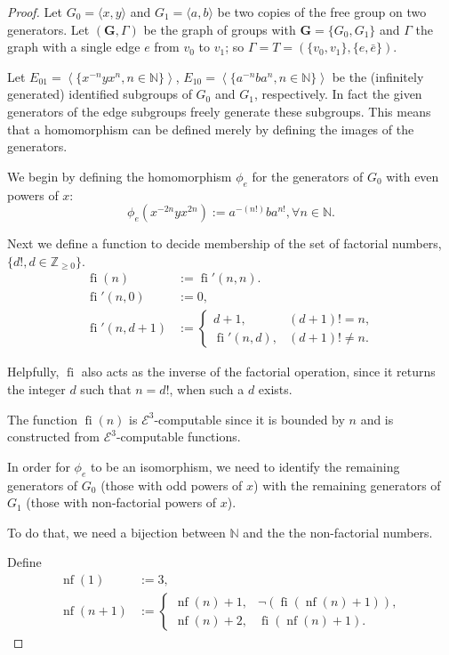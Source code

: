 \documentclass[a4paper]{article}
\newcommand{\grz}[1]{$\mathcal{E}^{#1}$}	%
\newcommand{\NN}{\mathbb{N}}	%
\newcommand{\ZZ}{\mathbb{Z}}
\newcommand{\recur}[1]{\begin{equation} \begin{split} #1 \end{split} \end{equation}}	%
\theoremstyle{plain}
\theoremstyle{definition}
\begin{document}
\begin{proof}
Let $G_0 = \langle x,y \rangle$ and $G_1 = \langle a,b \rangle$  
be two copies of the free group on two generators. Let $(\mathbf{G},\Gamma)$
 be the graph of groups with $\mathbf{G} = \{G_0,G_1\}$ and $\Gamma$ the 
graph
with a single edge $e$ from $v_0$ to $v_1$; so $\Gamma = T = (\{v_0,v_1\},\{e,\bar{e}\})$.

Let $E_{01} = \left \langle \{x^{-n}yx^n, n \in \mathbb{N} \} \right \rangle$, 
$E_{10} = \left\langle \{ a^{-n}ba^n, n \in \mathbb{N} \} \right\rangle$ be the 
(infinitely generated) identified subgroups of $G_0$ and $G_1$, respectively.
In fact the given generators of the edge subgroups freely generate
these subgroups. This means that a homomorphism can be defined merely
by defining the images of the generators.

We begin by defining the homomorphism $\phi_e$ for the generators of $G_0$ with even powers of $x$:
\[	\phi_{e}(x^{-2n}yx^{2n}) := a^{-(n!)}ba^{n!}, \forall n \in \NN. \]

Next we define a function to decide membership of the set of factorial numbers, $\{d!, d \in \ZZ_{\geq 0}\}$. \recur{
\operatorname{fi}(n) &:= \operatorname{fi}'(n,n).\\
\operatorname{fi}'(n,0) &:= 0, \\
\operatorname{fi}'(n,d+1) &:= 
	\begin{cases} 
		d+1, & (d+1)! = n, \\
		\operatorname{fi}'(n,d), & (d+1)! \neq n.
	\end{cases}
}

Helpfully, $\operatorname{fi}$ also acts as the inverse of the factorial operation, since it returns the integer $d$ such that $n = d!$, when such a $d$ exists.

The function $\operatorname{fi}(n)$ is \grz{3}-computable since it is bounded by $n$ and is constructed from \grz{3}-computable functions.

In order for $\phi_e$ to be an isomorphism, we need to identify the remaining generators of $G_0$ (those with odd powers of $x$) with the remaining generators of $G_1$ (those with non-factorial powers of $x$).

To do that, we need a bijection between $\NN$ and the the non-factorial numbers.

Define 
\recur{
	\operatorname{nf}(1) &:= 3, \\
	\operatorname{nf}(n+1) &:= 
		\begin{cases}
			\operatorname{nf}(n)+1, & \neg(\operatorname{fi}(\operatorname{nf}(n)+1)), \\
			\operatorname{nf}(n)+2, & \operatorname{fi}(\operatorname{nf}(n)+1).
		\end{cases}
}


\end{proof}
\end{document}
